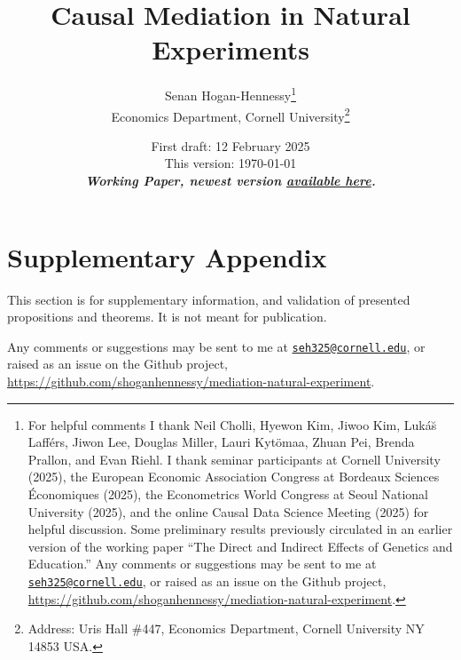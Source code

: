 \documentclass[notitlepage,12pt]{article}
\author{Senan Hogan-Hennessy\thanks{
    For helpful comments I thank
    Neil Cholli,
    Hyewon Kim,
    Jiwoo Kim,
    Luk\'a\u{s} Laff\'ers,
    Jiwon Lee,
    Douglas Miller,
    Lauri Kytömaa,
    Zhuan Pei,
    Brenda Prallon,
    and
    Evan Riehl.
    I thank seminar participants at
    Cornell University (2025),
    the European Economic Association Congress at Bordeaux Sciences \'Economiques (2025),
    the Econometrics World Congress at Seoul National University (2025),
    and
    the online Causal Data Science Meeting (2025)
    for helpful discussion.
    Some preliminary results previously circulated in an earlier version of the working paper ``The Direct and Indirect Effects of Genetics and Education.''
    Any comments or suggestions may be sent to me at \href{mailto:seh325@cornell.edu}{\nolinkurl{seh325@cornell.edu}}, or raised as an issue on the Github project,
    \url{https://github.com/shoganhennessy/mediation-natural-experiment}.
    } \\
    \vspace{0.1cm}
    Economics Department, Cornell University\footnote{
        Address: Uris Hall \#447, Economics Department, Cornell University NY 14853 USA.
    }
}
\title{Causal Mediation in Natural Experiments}
\date{
    First draft: 12 February 2025 \\
    This version:
    \today
    \\ \vspace{0.25cm}
    \textbf{\textit{Working Paper,
    newest version
    \href{https://raw.githubusercontent.com/shoganhennessy/mediation-natural-experiment/main/mediation-natural-experiment-2025.pdf}{available here}.}}
    \vspace{-1.0cm}
}
\begin{document}
\clearpage
\maketitle
\thispagestyle{empty}
\begin{abstract}
    
\end{abstract}

\newpage
\setcounter{page}{1}
\onehalfspacing
\noindent










\singlespacing



\newpage
\onehalfspacing
\appendix
\setcounter{table}{0}
\renewcommand{\thetable}{A\arabic{table}}
\setcounter{figure}{0}
\renewcommand{\thefigure}{A\arabic{figure}}

\section{Supplementary Appendix}
\label{appendix}
This section is for supplementary information, and validation of presented propositions and theorems.
It is not meant for publication.

Any comments or suggestions may be sent to me at \href{mailto:seh325@cornell.edu}{\nolinkurl{seh325@cornell.edu}},
or raised as an issue on the Github project,
\url{https://github.com/shoganhennessy/mediation-natural-experiment}.


\end{document}
